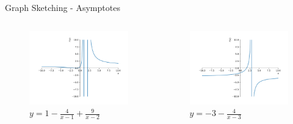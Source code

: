 \documentclass[10pt]{beamer}
\begin{document}
\begin{frame}{Graph Sketching - Asymptotes}
  \begin{columns}
    \begin{column}{0.5\textwidth}
      \begin{center}
        \begin{figure}[h!]
          \includegraphics[width=\textwidth]{beamer-pics/asymptote-1.pdf}
          \caption*{$y = 1 - \frac{4}{x-1} + \frac{9}{x-2}$}
        \end{figure}
      \end{center}
    \end{column}

    \begin{column}{0.5\textwidth}
      \begin{center}
        \begin{figure}
          \includegraphics[width=\textwidth]{beamer-pics/asymptote-2.pdf}
          \caption*{$y = -3 - \frac{4}{x-3}$}
        \end{figure}
      \end{center}
    \end{column}
  \end{columns}
\end{frame}
\end{document}

